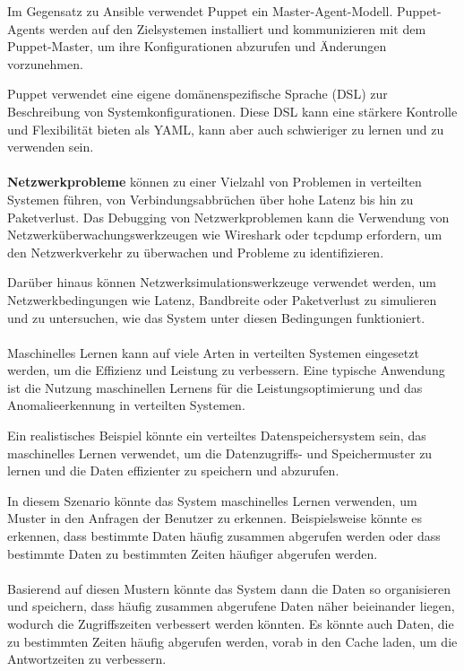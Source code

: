 Im Gegensatz zu Ansible verwendet Puppet ein Master-Agent-Modell. Puppet-Agents werden auf den Zielsystemen installiert und kommunizieren mit dem Puppet-Master, um ihre Konfigurationen abzurufen und Änderungen vorzunehmen.

Puppet verwendet eine eigene domänenspezifische Sprache (DSL) zur Beschreibung von Systemkonfigurationen. Diese DSL kann eine stärkere Kontrolle und Flexibilität bieten als YAML, kann aber auch schwieriger zu lernen und zu verwenden sein.
\\\\
\textbf{Netzwerkprobleme} können zu einer Vielzahl von Problemen in verteilten Systemen führen, von Verbindungsabbrüchen über hohe Latenz bis hin zu Paketverlust. Das Debugging von Netzwerkproblemen kann die Verwendung von Netzwerküberwachungswerkzeugen wie Wireshark oder tcpdump erfordern, um den Netzwerkverkehr zu überwachen und Probleme zu identifizieren.

Darüber hinaus können Netzwerksimulationswerkzeuge verwendet werden, um Netzwerkbedingungen wie Latenz, Bandbreite oder Paketverlust zu simulieren und zu untersuchen, wie das System unter diesen Bedingungen funktioniert.
\\\\
Maschinelles Lernen kann auf viele Arten in verteilten Systemen eingesetzt werden, um die Effizienz und Leistung zu verbessern. Eine typische Anwendung ist die Nutzung maschinellen Lernens für die Leistungsoptimierung und das Anomalieerkennung in verteilten Systemen.

Ein realistisches Beispiel könnte ein verteiltes Datenspeichersystem sein, das maschinelles Lernen verwendet, um die Datenzugriffs- und Speichermuster zu lernen und die Daten effizienter zu speichern und abzurufen.

In diesem Szenario könnte das System maschinelles Lernen verwenden, um Muster in den Anfragen der Benutzer zu erkennen. Beispielsweise könnte es erkennen, dass bestimmte Daten häufig zusammen abgerufen werden oder dass bestimmte Daten zu bestimmten Zeiten häufiger abgerufen werden.
\\\\
Basierend auf diesen Mustern könnte das System dann die Daten so organisieren und speichern, dass häufig zusammen abgerufene Daten näher beieinander liegen, wodurch die Zugriffszeiten verbessert werden könnten. Es könnte auch Daten, die zu bestimmten Zeiten häufig abgerufen werden, vorab in den Cache laden, um die Antwortzeiten zu verbessern.

